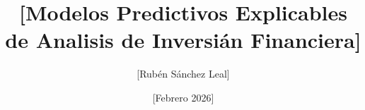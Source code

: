 \newcommand{\Estudios}{[Grado]}

\newcommand{\TituloEstudios}{[Ingeniería Informática]}

\newcommand{\Departamento}{[Departamento de Inteligencia Artificial]}

\newcommand{\NombreAutor}{[Rubén Sánchez Leal]}

\newcommand{\NombreTutor}{[Juan Antonio Fernández del Pozo de Salamanca]}

\newcommand{\TituloTFG}{[Modelos Predictivos Explicables de Analisis de Inversián Financiera]}

\newcommand{\Fecha}{[Febrero 2026]}

\title{\TituloTFG}
\author{\NombreAutor}
\date{\Fecha}
